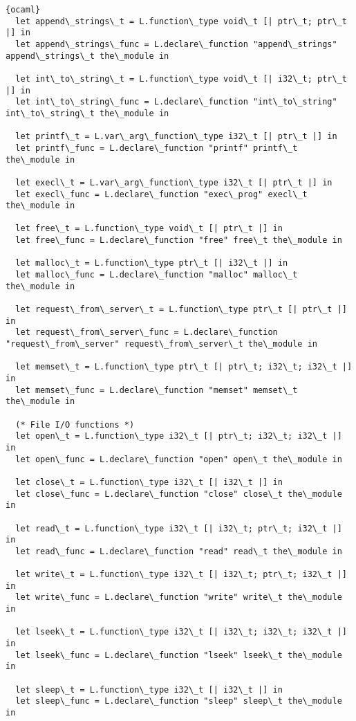 \begin{lstlisting}{ocaml}
  let append\_strings\_t = L.function\_type void\_t [| ptr\_t; ptr\_t |] in
  let append\_strings\_func = L.declare\_function "append\_strings" append\_strings\_t the\_module in

  let int\_to\_string\_t = L.function\_type void\_t [| i32\_t; ptr\_t |] in
  let int\_to\_string\_func = L.declare\_function "int\_to\_string" int\_to\_string\_t the\_module in

  let printf\_t = L.var\_arg\_function\_type i32\_t [| ptr\_t |] in
  let printf\_func = L.declare\_function "printf" printf\_t the\_module in

  let execl\_t = L.var\_arg\_function\_type i32\_t [| ptr\_t |] in
  let execl\_func = L.declare\_function "exec\_prog" execl\_t the\_module in

  let free\_t = L.function\_type void\_t [| ptr\_t |] in
  let free\_func = L.declare\_function "free" free\_t the\_module in

  let malloc\_t = L.function\_type ptr\_t [| i32\_t |] in
  let malloc\_func = L.declare\_function "malloc" malloc\_t the\_module in

  let request\_from\_server\_t = L.function\_type ptr\_t [| ptr\_t |] in
  let request\_from\_server\_func = L.declare\_function "request\_from\_server" request\_from\_server\_t the\_module in

  let memset\_t = L.function\_type ptr\_t [| ptr\_t; i32\_t; i32\_t |] in
  let memset\_func = L.declare\_function "memset" memset\_t the\_module in

  (* File I/O functions *)
  let open\_t = L.function\_type i32\_t [| ptr\_t; i32\_t; i32\_t |] in
  let open\_func = L.declare\_function "open" open\_t the\_module in

  let close\_t = L.function\_type i32\_t [| i32\_t |] in
  let close\_func = L.declare\_function "close" close\_t the\_module in

  let read\_t = L.function\_type i32\_t [| i32\_t; ptr\_t; i32\_t |] in
  let read\_func = L.declare\_function "read" read\_t the\_module in

  let write\_t = L.function\_type i32\_t [| i32\_t; ptr\_t; i32\_t |] in
  let write\_func = L.declare\_function "write" write\_t the\_module in 

  let lseek\_t = L.function\_type i32\_t [| i32\_t; i32\_t; i32\_t |] in
  let lseek\_func = L.declare\_function "lseek" lseek\_t the\_module in

  let sleep\_t = L.function\_type i32\_t [| i32\_t |] in
  let sleep\_func = L.declare\_function "sleep" sleep\_t the\_module in


\end{lstlisting}

